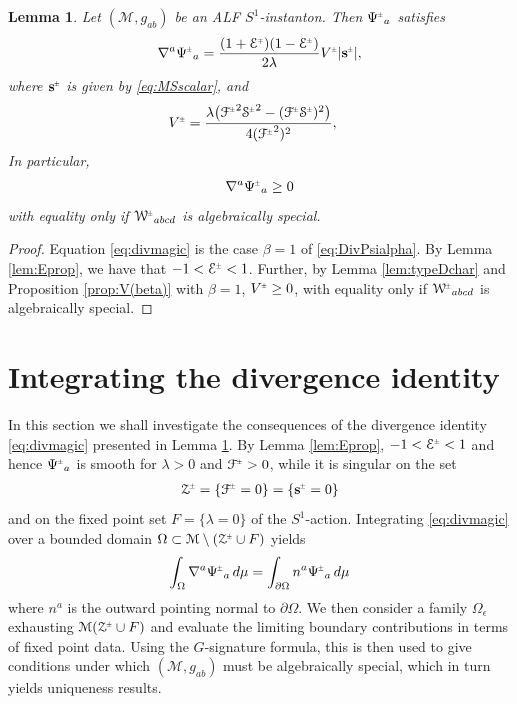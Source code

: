 \documentclass[a4paper,10pt,reqno]{amsart}
\newcommand{\Scal}{\mathop{\rm Scal}}
\newcommand{\cE}{\mathcal{E}}
\newcommand{\cZ}{\mathcal{Z}}
\newcommand{\cM}{\mathcal{M}}
\theoremstyle{plain}
\newtheorem{lemma}[thm]{Lemma}
\newcommand{\PM}[1]{{{#1}^{\hspace{-.5pt}\scaleto{\pm}{3.5pt}}}}
\newcommand{\MP}[1]{{{#1}^{\hspace{-.5pt}\scaleto{\mp}{3.5pt}}}}
\newcommand{\eps}{\epsilon}
\newcommand{\Fixed}{F}
\def\Wcal{\mathcal{W}}
\def\Fcal{\mathcal{F}}
\def\Ecal{\mathcal{E}}
\def\Scal{\mathcal{S}}
\def\sbold{\mathbf{s}}
\numberwithin{equation}{section}
\begin{document}
\begin{lemma} \label{lem:magic}  
Let $(\cM, g_{ab})$ be an ALF $S^1$-instanton. Then $\PM{\Psi}_a$ satisfies
\begin{align} \label{eq:divmagic} 
\nabla^a \PM{\Psi}_a = \frac{(1 + \MP{\Ecal}) (1 -  \PM{\Ecal})}{2\lambda} \PM{V} |\PM{\sbold}| ,
\end{align}
where $\PM{\sbold}$ is given by \eqref{eq:MSscalar}, and 
\begin{align} \label{eq:Vpm1}
\PM{V} ={}& \frac{\lambda \bigl(\PM{\Fcal}^2 \PM{\Scal}^2 - (\PM{\Fcal}\PM{\Scal})^2 \bigr) }{4 (\PM{\Fcal}^2)^2}, 
\end{align} 
In particular, 
\begin{align} 
\nabla^a \PM{\Psi}_a \geq 0
\end{align} 
with equality only if $\PM{\Wcal}_{abcd}$ is algebraically special.  
\end{lemma}

\begin{proof} 
Equation \eqref{eq:divmagic} is the case $\beta=1$ of \eqref{eq:DivPsialpha}. By Lemma \ref{lem:Eprop}, we have that $-1 < \PM{\cE} < 1$. Further, by Lemma \ref{lem:typeDchar} and Proposition \ref{prop:V(beta)} with $\beta=1$, $\PM{V} \geq 0$, with equality only if $\PM{\Wcal}_{abcd}$ is algebraically special. 
\end{proof} 


%
\section{Integrating the divergence identity} \label{sec:int}
%

In this section we shall investigate the consequences of the divergence identity \eqref{eq:divmagic} presented in Lemma \ref{lem:magic}. By Lemma \ref{lem:Eprop}, $-1 < \PM{\cE} < 1$ and hence 
$\PM{\Psi}_a$ is smooth for $\lambda > 0$ and $\PM{\Fcal} > 0$, while it is singular on the set
\begin{align} \label{eq:cZdef}
\PM{\cZ} = \{\PM{\Fcal} = 0\} = \{\PM{\sbold} = 0\}
\end{align}
and on the fixed point set $\Fixed = \{\lambda = 0\}$ of the $S^1$-action. Integrating \eqref{eq:divmagic} over a bounded domain  $\Omega \subset \cM \setminus (\PM{\cZ} \cup \Fixed)$ 
yields 
\begin{align} \label{eq:magic-boundary} 
\int_\Omega \nabla^a \PM{\Psi}_a \, d\mu
= \int_{\partial \Omega} n^a \PM{\Psi}_a \, d\mu
\end{align} 
where $n^a$ is the outward pointing normal to $\partial \Omega$. We then consider a family $\Omega_\eps$ exhausting $\cM (\PM{\cZ} \cup \Fixed)$ and evaluate the limiting boundary contributions in terms of fixed point data. Using the $G$-signature formula, this is then used to give conditions under which  $(\cM, g_{ab})$ must be algebraically special, which in turn yields uniqueness results. 
\end{document}
